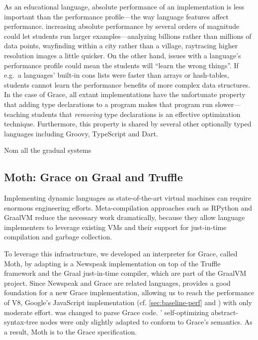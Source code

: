 As an educational language\citep{panel}, absolute performance of an
implementation is less important than the performance profile---the
way language features affect performance.  increasing absolute
performance by several orders of magnitude could let students run
larger examples---analyzing billions rather than millions of data
points, wayfinding within a city rather than a village, raytracing
higher resolution images a little quicker.  On the other hand, issues
with a language's performance profile could mean the students will
``learn the wrong things''.  If e.g.\ a languages' built-in cons lists
were faster than arrays or hash-tables, students cannot learn the
performance benefits of more complex data structures. In the case of
Grace, all extant implementations have the unfortunate property that
adding type declarations to a program makes that program run slower---teaching students that \emph{removing} type declarations is an
effective optimization technique.
Furthermore, this property is shared
by several other optionally typed languages including Groovy,
TypeScript and Dart\citep{Muehlboeck2017,find-who-says-this-and-cite-them}.
\begin{cnote}
Nom\citep{Muehlboeck2017}
all the gradual systems
\end{cnote}

\subsection{Moth: Grace on Graal and Truffle}
\label{ssec:moth}

Implementing dynamic languages as state-of-the-art virtual machines
can require enormous engineering efforts.
Meta-compilation approaches\citep{Marr:2015:MTPE}
such as RPython\citep{Bolz:2009:TMP,Bolz:2013:IMT}
and GraalVM\citep{Wurthinger2013,Wurthinger:2017:PPE}
reduce the necessary work dramatically,
because they allow language implementers to leverage existing VMs
and their support for just-in-time compilation and garbage collection.

To leverage this infrastructure, we developed an interpreter for Grace,
called Moth\citep{Roberts2017}, by adapting
\SOMns is a Newspeak implementation\citep{Bracha:10:NS} on top of the Truffle framework and the Graal just-in-time compiler,
which are part of the GraalVM project.
Since Newspeak and Grace are related languages,
\SOMns provides a good foundation for a new Grace implementation,
allowing us to reach the performance of V8,
Google's JavaScript implementation
(cf. \cref{sec:baseline-perf} and \citet{Marr2016})
with only moderate effort.
\SOMns was changed to parse Grace code.
\SOMns' self-optimizing abstract-syntax-tree nodes were only slightly adapted to conform to Grace's semantics.
As a result, Moth is  to the Grace specification.

